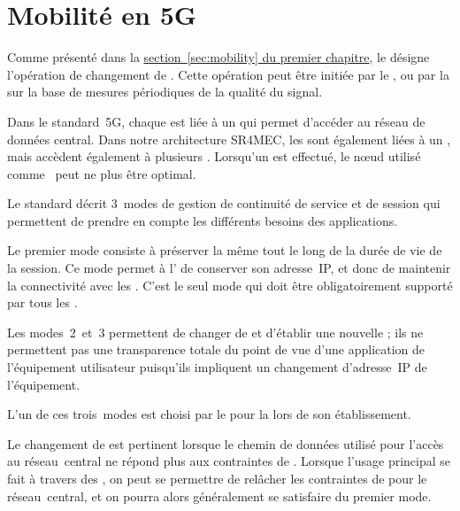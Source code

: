\documentclass[../main.tex]{subfiles}
\begin{document}
\pagebreak
\section{Mobilité en 5G}
\label{sec:mobility-in-5G}
Comme présenté dans la \hyperref[sec:mobility]{section~\ref*{sec:mobility} du premier chapitre}, le  désigne l’opération de changement de .
Cette opération peut être initiée par le , ou par la  sur la base de mesures périodiques de la qualité du signal.

Dans le standard~5G, chaque  est liée à un  qui permet d’accéder au réseau de données central.
Dans notre architecture SR4MEC, les  sont également liées à un , mais accèdent également à plusieurs .
Lorsqu’un  est effectué, le nœud utilisé comme~ peut ne plus être optimal.

Le standard décrit 3~modes de gestion de continuité de service et de session qui permettent de prendre en compte les différents besoins des applications.

Le premier mode consiste à préserver la même  tout le long de la durée de vie de la session.
Ce mode permet à l’ de conserver son adresse~IP, et donc de maintenir la connectivité avec les .
C’est le seul mode qui doit être obligatoirement supporté par tous les .

Les modes~2~et~3 permettent de changer de  et d’établir une nouvelle ; ils ne permettent pas une transparence totale du point de vue d’une application de l’équipement utilisateur puisqu’ils impliquent un changement d’adresse~IP de l’équipement.

L’un de ces trois~modes est choisi par le  pour la  lors de son établissement.

Le changement de  est pertinent lorsque le chemin de données utilisé pour l’accès au réseau~central ne répond plus aux contraintes de .
Lorsque l’usage principal se fait à travers des , on peut se permettre de relâcher les contraintes de  pour le réseau~central, et on pourra alors généralement se satisfaire du premier mode.
\end{document}
